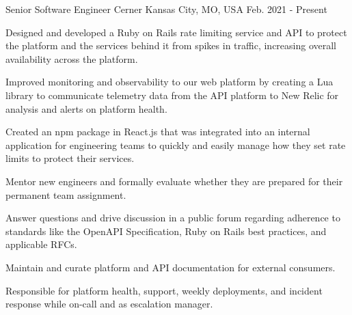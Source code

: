 

\begin{cventries}

  \cventry
    {Senior Software Engineer} %
    {Cerner} %
    {Kansas City, MO, USA} %
    {Feb. 2021 - Present} %
    {
      \begin{cvitems} %
        \item {Designed and developed a Ruby on Rails rate limiting service and API to protect the platform and the services behind it from spikes in traffic, increasing overall availability across the platform.}
        \item {Improved monitoring and observability to our web platform by creating a Lua library to communicate telemetry data from the API platform to New Relic for analysis and alerts on platform health.}
        \item {Created an npm package in React.js that was integrated into an internal application for engineering teams to quickly and easily manage how they set rate limits to protect their services.}
        \item {Mentor new engineers and formally evaluate whether they are prepared for their permanent team assignment.}
        \item {Answer questions and drive discussion in a public forum regarding adherence to standards like the OpenAPI Specification, Ruby on Rails best practices, and applicable RFCs.}
        \item {Maintain and curate platform and API documentation for external consumers.}
        \item {Responsible for platform health, support, weekly deployments, and incident response while on-call and as escalation manager.}
      \end{cvitems}
    }


\end{cventries}
